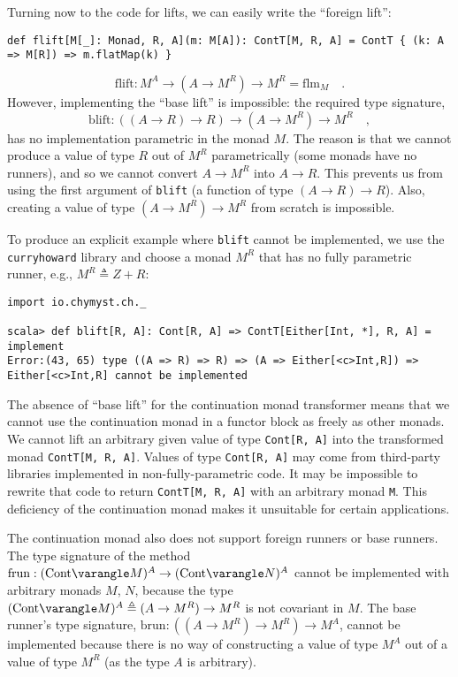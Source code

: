 Turning now to the code for lifts, we can easily write the \textsf{``}foreign
lift\textsf{''}:
\begin{lstlisting}
def flift[M[_]: Monad, R, A](m: M[A]): ContT[M, R, A] = ContT { (k: A => M[R]) => m.flatMap(k) }
\end{lstlisting}
\[
\text{flift}:M^{A}\rightarrow(A\rightarrow M^{R})\rightarrow M^{R}=\text{flm}_{M}\quad.
\]
However, implementing the \textsf{``}base lift\textsf{''} is impossible: the required
type signature,
\[
\text{blift}:(\left(A\rightarrow R\right)\rightarrow R)\rightarrow(A\rightarrow M^{R})\rightarrow M^{R}\quad,
\]
has no implementation parametric in the monad $M$. The reason is
that we cannot produce a value of type $R$ out of $M^{R}$ parametrically
(some monads have no runners), and so we cannot convert $A\rightarrow M^{R}$
into $A\rightarrow R$. This prevents us from using the first argument
of \lstinline!blift! (a function of type $(A\rightarrow R)\rightarrow R$).
Also, creating a value of type $(A\rightarrow M^{R})\rightarrow M^{R}$
from scratch is impossible. 

To produce an explicit example where \lstinline!blift! cannot be
implemented, we use the \lstinline!curryhoward! library
and choose a monad $M^{R}$ that has no fully parametric runner, e.g.,
$M^{R}\triangleq Z+R$:
\begin{lstlisting}
import io.chymyst.ch._

scala> def blift[R, A]: Cont[R, A] => ContT[Either[Int, *], R, A] = implement
Error:(43, 65) type ((A => R) => R) => (A => Either[<c>Int,R]) => Either[<c>Int,R] cannot be implemented
\end{lstlisting}

The absence of \textsf{``}base lift\textsf{''} for the continuation monad transformer
means that we cannot use the continuation monad in a functor block
as freely as other monads. We cannot lift an arbitrary given value
of type \lstinline!Cont[R, A]! into the transformed monad \lstinline!ContT[M, R, A]!.
Values of type \lstinline!Cont[R, A]! may come from third-party libraries
implemented in non-fully-parametric code. It may be impossible to
rewrite that code to return \lstinline!ContT[M, R, A]! with an arbitrary
monad \lstinline!M!. This deficiency of the continuation monad makes
it unsuitable for certain applications. 

The continuation monad also does not support foreign runners or base
runners. The type signature of the method $\text{frun}:(\text{Cont}\varangle M)^{A}\rightarrow(\text{Cont}\varangle N)^{A}$
cannot be implemented with arbitrary monads $M$, $N$, because the
type $(\text{Cont}\varangle M)^{A}\triangleq(A\rightarrow M^{R})\rightarrow M^{R}$
is not covariant in $M$. The base runner\textsf{'}s type signature, $\text{brun}:((A\rightarrow M^{R})\rightarrow M^{R})\rightarrow M^{A}$,
cannot be implemented because there is no way of constructing a value
of type $M^{A}$ out of a value of type $M^{R}$ (as the type $A$
is arbitrary).

